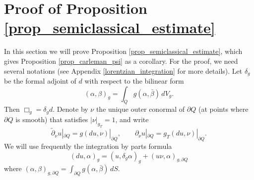\documentclass[11pt,letterpaper]{amsart}
\theoremstyle{definition}
\numberwithin{equation}{section}
\newcommand{\p}{\partial}
\def\p{\partial}
\begin{document}
\section{Proof of Proposition \ref{prop_semiclassical_estimate}} \label{sec_carleman_appendix}

In this section we will prove Proposition \ref{prop_semiclassical_estimate}, which gives Proposition \ref{prop_carleman_psi} as a corollary. For the proof, we need several notations (see Appendix \ref{lorentzian_integration} for more details). Let $\delta_g$ be the formal adjoint of $d$ with respect to the bilinear form 
\[
(\alpha, \beta)_g = \int_Q g(\alpha, \bar{\beta}) \,dV_g.
\]
Then $\Box_g = \delta_g d$. Denote by $\nu$ the unique outer conormal of $\p Q$ (at points where $\p Q$ is smooth) that satisfies $|\nu|_{g_T} = 1$, and write 
\[
\tilde{\p}_{\nu} u|_{\p Q} = g(du, \nu)|_{\p Q}, \qquad \p_{\nu} u|_{\p Q} = g_T(du, \nu)|_{\p Q}.
\]
We will use frequently the integration by parts formula 
\[
(du, \alpha)_g = (u, \delta_g \alpha)_g + (u \nu, \alpha)_{g, \p Q}
\]
where $(\alpha, \beta)_{g, \p Q} = \int_{\p Q} g(\alpha, \bar{\beta}) \,dS$.
\end{document}
